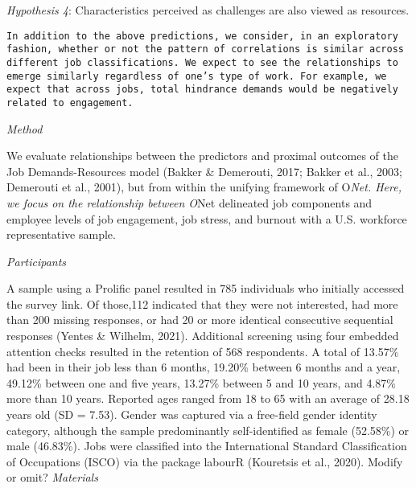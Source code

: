 \documentclass[
  man]{apa6}
\begin{document}
\emph{Hypothesis 4}: Characteristics perceived as challenges are also viewed as resources.

\begin{verbatim}
In addition to the above predictions, we consider, in an exploratory fashion, whether or not the pattern of correlations is similar across different job classifications. We expect to see the relationships to emerge similarly regardless of one’s type of work. For example, we expect that across jobs, total hindrance demands would be negatively related to engagement.
\end{verbatim}

\emph{Method}

We evaluate relationships between the predictors and proximal outcomes of the Job Demands-Resources model (Bakker \& Demerouti, 2017; Bakker et al., 2003; Demerouti et al., 2001), but from within the unifying framework of O\emph{Net. Here, we focus on the relationship between O}Net delineated job components and employee levels of job engagement, job stress, and burnout with a U.S. workforce representative sample.

\emph{Participants}

A sample using a Prolific panel resulted in 785 individuals who initially accessed the survey link. Of those,112 indicated that they were not interested, had more than 200 missing responses, or had 20 or more identical consecutive sequential responses (Yentes \& Wilhelm, 2021). Additional screening using four embedded attention checks resulted in the retention of 568 respondents. A total of 13.57\% had been in their job less than 6 months, 19.20\% between 6 months and a year, 49.12\% between one and five years, 13.27\% between 5 and 10 years, and 4.87\% more than 10 years. Reported ages ranged from 18 to 65 with an average of 28.18 years old (SD = 7.53). Gender was captured via a free-field gender identity category, although the sample predominantly self-identified as female (52.58\%) or male (46.83\%). Jobs were classified into the International Standard Classification of Occupations (ISCO) via the package labourR (Kouretsis et al., 2020). Modify or omit?
\emph{Materials}
\end{document}
